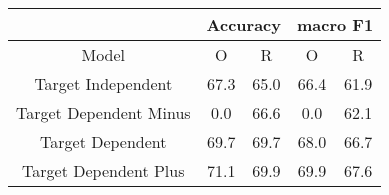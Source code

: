 \begin{tabular}{|c|c|c|c|c|}
 \hline
 & \multicolumn{2}{c|}{Accuracy} & \multicolumn{2}{c|}{macro F1} \\
 \hline
 Model & O & R & O & R \\ 
 \hline
 Target Independent     &     67.3 &         65.0 &     66.4 &         61.9 \\
 \hline
 Target Dependent Minus &      0.0 &         66.6 &      0.0 &         62.1 \\
 \hline
 Target Dependent       &     69.7 &         69.7 &     68.0 &         66.7 \\
 \hline
 Target Dependent Plus  &     71.1 &         69.9 &     69.9 &         67.6 \\
\hline
\end{tabular}